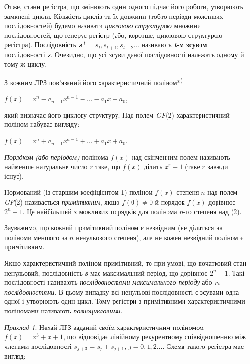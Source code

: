 Отже, стани регістра, що змінюють один одного підчас його роботи, утворюють
замкнені цикли. Кількість циклів та їх довжини (тобто періоди можливих
послідовностей) будемо називати \textit{цикловою структурою}\textbf{ }множини
послідовностей, що генерує регістр (або, коротше, цикловою структурою
регістра). Послідовність \textbf{\textit{s}}
${}^{t}=s_t,s_{t+1},s_{t+2}\dots$ називають
\textbf{\textit{t}}\textbf{\textit{}-м зсувом} послідовності\textbf{
}\textbf{\textit{s}}. Очевидно, що усі зсуви даної послідовності належать
одному й тому ж циклу.


\bigskip


\bigskip

З кожним ЛРЗ пов’язаний його характеристичний поліном*\textsuperscript{)}

{\centering
 $f(x)=x^{n}-a_{n-1}x^{n-1}-\dots-a_{1}x-a_0$,
\par}

який визначає його циклову структуру. Над полем \textit{GF}(2) характеристичний
поліном набуває вигляду:

{\centering
 $f(x)=x^{n}+a_{n-1}x^{n-1}+\dots+a_{1}x+a_0$.
\par}

\textit{Порядком (або періодом)} полінома  $f(x)$  над скінченним полем
називають найменше натуральне число  $r$ таке, що  $f(x)$ ділить 
$x^r-1$ (таке  $r$ завжди існує).

Нормований (із старшим коефіцієнтом 1) поліном  $f(x)$ степеня  $n$ над
полем \textit{GF}(2) називається \textit{примітивним}, якщо  $f(0)\neq 0$ й
порядок  $f(x)$ дорівнює  $2^n-1$. Це найбільший з можливих порядків
для полінома  $n${}-го степеня над \textitGF(2). $ $

Зауважимо, що кожний примітивний поліном є незвідним (не ділиться на поліноми
меншого за  $n$ ненульового степеня), але не кожен незвідний поліном є
примітивним.

Якщо характеристичний поліном примітивний, то при умові, що початковий стан
ненульовий, послідовність \textbf{\textit{s}} має максимальний період, що
дорівнює  $2^n-1$. Такі послідовності називають \textit{послідовностями
максимального періоду }або\textit{ }\textit{m}\textit{{}-послідовностями}. В
цьому випадку всі ненульові послідовності є зсувами одна одної і утворюють один
цикл. Тому регістри з примітивними характеристичними поліномами називають
\textit{повноцикловими}.\textbf{ }

\textit{Приклад 1}. Нехай ЛРЗ заданий своїм характеристичним поліномом 
$f(x)=x^3+x+1$, що відповідає лінійному рекурентному співвідношенню між
членами послідовності  $s_{j+3}=s_j+s_{j+1}$,
$j=0,1,2\dots$. Схема такого регістра має вигляд:


